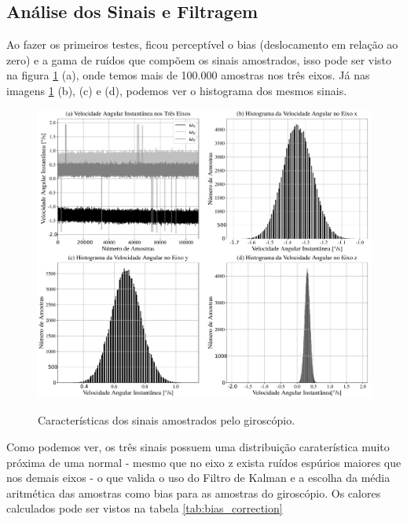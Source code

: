 
\subsection{Análise dos Sinais e Filtragem}

Ao fazer os primeiros testes, ficou perceptível o bias (deslocamento em relação ao zero) e a gama de ruídos que compõem os sinais amostrados, isso pode ser visto na figura \ref{fig:bias_correction} (a), onde temos mais de 100.000 amostras nos três eixos. Já nas imagens \ref{fig:bias_correction} (b), (c) e (d), podemos ver o histograma dos mesmos sinais.

\begin{figure}[H]
  \caption{Características dos sinais amostrados pelo giroscópio.}
      \includegraphics[scale=.4]{metodologia/img/bias_correction}
  \label{fig:bias_correction}
\end{figure}

Como podemos ver, os três sinais possuem uma distribuição caraterística muito próxima de uma normal - mesmo que no eixo z exista ruídos espúrios maiores que nos demais eixos - o que valida o uso do Filtro de Kalman e a escolha da média aritmética das amostras como bias para as amostras do giroscópio. Os calores calculados pode ser vistos na tabela \ref{tab:bias_correction} 

